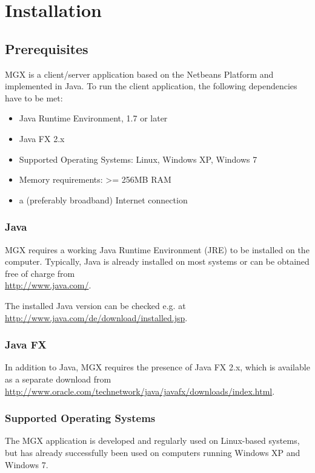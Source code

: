 
\chapter{Installation}
\label{installation}

\section{Prerequisites}

MGX is a client/server application based on the Netbeans Platform and implemented
in Java. To run the client application, the following dependencies have to be
met:

\begin{itemize}
  \item Java Runtime Environment, 1.7 or later
  \item Java FX 2.x
  \item Supported Operating Systems: Linux, Windows XP, Windows 7
  \item Memory requirements: >= 256MB RAM
  \item a (preferably broadband) Internet connection
\end{itemize}

\subsection{Java}

MGX requires a working Java Runtime Environment (JRE) to be installed on the computer. Typically,
Java is already installed on most systems or can be obtained free of charge from \\
\url{http://www.java.com/}.

The installed Java version can be checked e.g. at \url{http://www.java.com/de/download/installed.jsp}.

\subsection{Java FX}

In addition to Java, MGX requires the presence of Java FX 2.x, which is available as a separate
download from \url{http://www.oracle.com/technetwork/java/javafx/downloads/index.html}.

\subsection{Supported Operating Systems}

The MGX application is developed and regularly used on Linux-based systems, but has already
successfully been used on computers running Windows XP and Windows 7.

